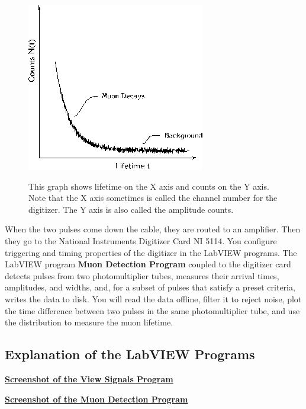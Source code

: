 \documentclass{../lab}
\begin{document}
\begin{figure}[h]
    \centering
    \href{http://experimentationlab.berkeley.edu/sites/default/files/images/MUOimage008.gif}{\includegraphics[width=0.5\linewidth]{images/MUOimage008.png}}
    \caption{This graph shows lifetime on the X axis and counts on the Y axis. Note that the X axis  sometimes is called the channel number for the digitizer. The Y axis is also called the amplitude counts.}
    \label{fig:MUOimage008}
\end{figure}

When the two pulses come down the cable, they are routed to an amplifier. Then they go to the National Instruments Digitizer Card NI 5114. You configure triggering and timing properties of the digitizer in the LabVIEW programs. The LabVIEW program \textbf{Muon Detection Program} coupled to the digitizer card detects pulses from two photomultiplier tubes, measures their arrival times, amplitudes, and widths, and, for a subset of pulses that satisfy a preset criteria, writes the data to disk. You will read the data offline, filter it to reject noise, plot the time difference between two pulses in the same photomultiplier tube, and use the distribution to measure the muon lifetime.

\subsection{Explanation of the LabVIEW Programs}

\href{http://experimentationlab.berkeley.edu/sites/default/files/Muon/Viewsignalsprogram.png}{\textbf{Screenshot of the View Signals Program}}

\noindent\href{http://experimentationlab.berkeley.edu/sites/default/files/Muon/MUONdetectionprogram\_2.png}{\textbf{Screenshot of the Muon Detection Program}}
\end{document}
